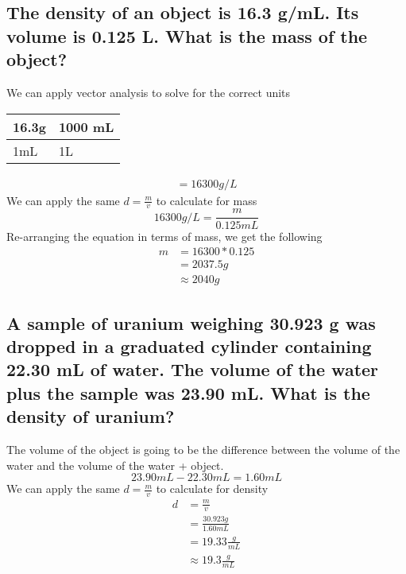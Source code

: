 \documentclass[11pt]{article}
\begin{document}
\subsection{The density of an object is 16.3 g/mL. Its volume is 0.125 L. What is the mass of the object?}
\label{sec:org080cc14}
We can apply vector analysis to solve for the correct units
\begin{center}
\begin{tabular}{ll}
16.3g & 1000 mL\\
\hline
1mL & 1L\\
\end{tabular}
\end{center}
\begin{align*}
=16300{g}/{L}
\end{align*}
We can apply the same \(d=\frac{m}{v}\) to calculate for mass
\begin{equation}
16300{g}/{L}=\frac{m}{0.125mL}
\end{equation}
Re-arranging the equation in terms of mass, we get the following
\begin{align*}
m &= 16300 * 0.125\\
&= 2037.5g\\
&\approx 2040g
\end{align*}

\subsection{A sample of uranium weighing 30.923 g was dropped in a graduated cylinder containing 22.30 mL of water. The volume of the water plus the sample was 23.90 mL. What is the density of uranium?}
\label{sec:orgbdfb8e6}
The volume of the object is going to be the difference between the volume of the water and the volume of the water + object.
\begin{equation}
23.90mL - 22.30mL = 1.60mL
\end{equation}
We can apply the same \(d=\frac{m}{v}\) to calculate for density
\begin{align*}
d&=\frac{m}{v} \\
            &=\frac{30.923g}{1.60mL}\\
            &=19.33\frac{g}{mL}\\
            &\approx19.3\frac{g}{mL}
\end{align*}
\end{document}
